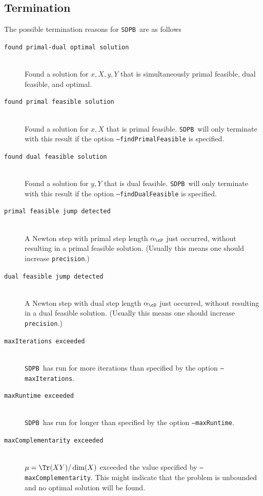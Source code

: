 \documentclass[12pt]{article}
\numberwithin{equation}{section}
\newcommand\SDPB{\texttt{SDPB}}
\begin{document}
\subsection{Termination}

The possible termination reasons for \SDPB\ are as follows
\begin{description}
\item[\texttt{found primal-dual optimal solution}] \hfill\\
Found a solution for $x,X,y,Y$ that is simultaneously primal feasible, dual feasible, and optimal.
\item[\texttt{found primal feasible solution}] \hfill\\
Found a solution for $x,X$ that is primal feasible.  \SDPB\ will only terminate with this result if the option \texttt{--findPrimalFeasible} is specified.
\item[\texttt{found dual feasible solution}] \hfill\\
Found a solution for $y,Y$ that is dual feasible.  \SDPB\ will only terminate with this result if the option \texttt{--findDualFeasible} is specified.
\item[\texttt{primal feasible jump detected}] \hfill\\
A Newton step with primal step length $\alpha_\cP$ just occurred, without resulting in a primal feasible solution.  (Usually this means one should increase \texttt{precision}.)
\item[\texttt{dual feasible jump detected}] \hfill\\
A Newton step with dual step length $\alpha_\cD$ just occurred, without resulting in a dual feasible solution.  (Usually this means one should increase \texttt{precision}.)
\item[\texttt{maxIterations exceeded}] \hfill\\
\SDPB\ has run for more iterations than specified by the option \texttt{--maxIterations}.
\item[\texttt{maxRuntime exceeded}] \hfill\\
\SDPB\ has run for longer than specified by the option \texttt{--maxRuntime}.
\item[\texttt{maxComplementarity exceeded}] \hfill\\
$\mu=\Tr(XY)/\dim(X)$ exceeded the value specified by \texttt{--maxComplementarity}.  This might indicate that the problem is unbounded and no optimal solution will be found.
\end{description}
\end{document}
